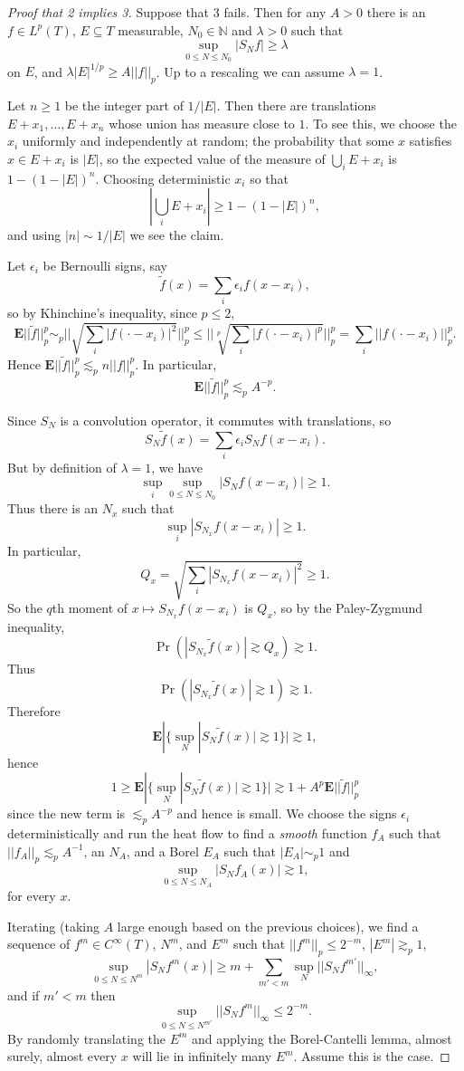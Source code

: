 \documentclass[12pt]{report}
\newcommand{\NN}{\mathbb{N}}
\newcommand{\Expect}{\mathbf E}
\theoremstyle{definition}
\begin{document}
\begin{proof}[Proof that 2 implies 3]
Suppose that 3 fails.
Then for any $A > 0$ there is an $f \in L^p(T)$, $E \subseteq T$ measurable, $N_0 \in \NN$ and $\lambda > 0$ such that
$$\sup_{0 \leq N \leq N_0} |S_Nf| \geq \lambda$$
on $E$, and $\lambda |E|^{1/p} \geq A||f||_p$. Up to a rescaling we can assume $\lambda = 1$.

Let $n \geq 1$ be the integer part of $1/|E|$. Then there are translations $E + x_1, \dots, E + x_n$ whose union has measure close to $1$.
To see this, we choose the $x_i$ uniformly and independently at random; the probability that some $x$ satisfies $x \in E + x_i$ is $|E|$, so the expected value of the measure of $\bigcup_i E + x_i$ is $1 - (1 - |E|)^n$. Choosing deterministic $x_i$ so that
$$\left|\bigcup_i E + x_i\right| \geq 1 - (1 - |E|)^n,$$
and using $|n| \sim 1/|E|$ we see the claim.

Let $\epsilon_i$ be Bernoulli signs, say
$$\tilde f(x) = \sum_i \epsilon_i f(x - x_i),$$
so by Khinchine's inequality, since $p \leq 2$,
$$\Expect ||\tilde f||_p^p \sim_p ||\sqrt{\sum_i |f(\cdot - x_i)|^2}||_p^p \leq ||\sqrt[p]{\sum_i |f(\cdot - x_i)|^p}||_p^p = \sum_i ||f(\cdot - x_i)||_p^p.$$
Hence $\Expect ||\tilde f||_p^p \lesssim_p n ||f||_p^p$. In particular,
$$\Expect ||\tilde f||_p^p \lesssim_p A^{-p}.$$

Since $S_N$ is a convolution operator, it commutes with translations, so
$$S_N \tilde f(x) = \sum_i \epsilon_i S_Nf(x - x_i).$$
But by definition of $\lambda = 1$, we have
$$\sup_i \sup_{0 \leq N \leq N_0} |S_Nf(x - x_i)| \geq 1.$$
Thus there is an $N_x$ such that
$$\sup_i |S_{N_x}f(x - x_i)| \geq 1.$$
In particular,
$$Q_x = \sqrt{\sum_i |S_{N_x}f(x - x_i)|^2} \geq 1.$$
So the $q$th moment of $x \mapsto S_{N_x}f(x - x_i)$ is $Q_x$, so by the Paley-Zygmund inequality,
$$\Pr(|S_{N_x}\tilde f(x)| \gtrsim Q_x) \gtrsim 1.$$
Thus
$$\Pr(|S_{N_x}\tilde f(x)| \gtrsim 1) \gtrsim 1.$$
Therefore
$$\Expect|\{\sup_N |S_N\tilde f(x)| \gtrsim 1\}| \gtrsim 1,$$
hence
$$1 \geq \Expect|\{\sup_N |S_N \tilde f(x)| \gtrsim 1\}| \gtrsim 1 + A^p\Expect||\tilde f||_p^p$$
since the new term is $\lesssim_p A^{-p}$ and hence is small.
We choose the signs $\epsilon_i$ deterministically and run the heat flow to find a \emph{smooth} function $f_A$ such that
$||f_A||_p \lesssim_p A^{-1}$, an $N_A$, and a Borel $E_A$ such that $|E_A| \sim_p 1$ and
$$\sup_{0 \leq N \leq N_A} |S_Nf_A(x)| \gtrsim 1,$$
for every $x$.

Iterating (taking $A$ large enough based on the previous choices), we find a sequence of $f^m \in C^\infty(T)$, $N^m$, and $E^m$ such that $||f^m||_p \leq 2^{-m}$, $|E^m| \gtrsim_p 1$,
$$\sup_{0 \leq N \leq N^m} |S_Nf^m(x)| \geq m + \sum_{m' < m} \sup_N ||S_Nf^{m'}||_\infty,$$
and if $m' < m$ then
$$\sup_{0 \leq N \leq N^{m'}} ||S_Nf^m||_\infty \leq 2^{-m}.$$
By randomly translating the $E^m$ and applying the Borel-Cantelli lemma, almost surely, almost every $x$ will lie in infinitely many $E^m$.
Assume this is the case.


\end{proof}
\end{document}
